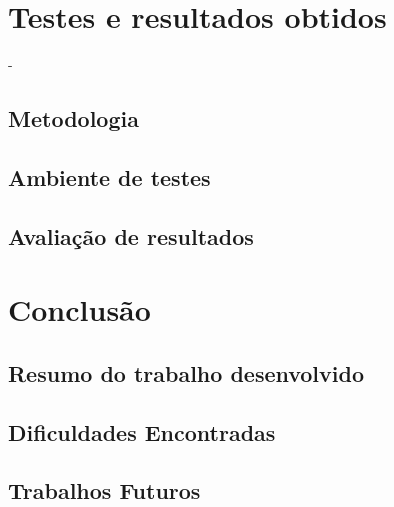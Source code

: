 \documentclass[ruledheader]{abnt} %
\begin{document}
\chapter{Testes e resultados obtidos}
\label{c_testeEresultados}
- 

\section{Metodologia}
\label{s_metodologia} %

\section{Ambiente de testes}
\label{s_ambienteDetestes} %

\section{Avaliação de resultados}
\label{s_avaliacaoResultados} %



\chapter{Conclusão}
\label{c_conclusao}

\section{Resumo do trabalho desenvolvido}
\label{s_resumoDoTrabalho} %

\section{Dificuldades Encontradas}
\label{s_dificuldadeEncontradas} %

\section{Trabalhos Futuros}
\label{s_trabalhosFuturos} %



\nocite{*}



\end{document}
